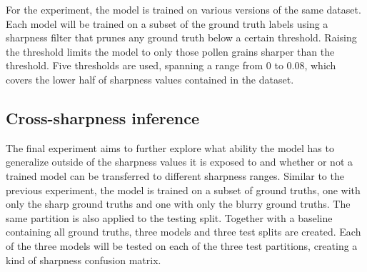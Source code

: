 For the experiment, the model is trained on various versions of the same dataset.
Each model will be trained on a subset of the ground truth labels using a sharpness filter that prunes any ground truth below a certain threshold.
Raising the threshold limits the model to only those pollen grains sharper than the threshold.
Five thresholds are used, spanning a range from 0 to 0.08, which covers the lower half of sharpness values contained in the dataset.

\subsection{Cross-sharpness inference}
The final experiment aims to further explore what ability the model has to generalize outside of the sharpness values it is exposed to and whether or not a trained model can be transferred to different sharpness ranges.
Similar to the previous experiment, the model is trained on a subset of ground truths, one with only the sharp ground truths and one with only the blurry ground truths.
The same partition is also applied to the testing split.
Together with a baseline containing all ground truths, three models and three test splits are created.
Each of the three models will be tested on each of the three test partitions, creating a kind of sharpness confusion matrix.
